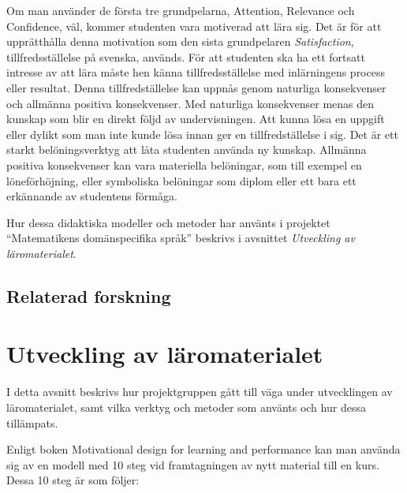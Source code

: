 \documentclass[]{article}
\begin{document}
Om man använder de första tre grundpelarna, Attention, Relevance och Confidence,
väl, kommer studenten vara motiverad att lära sig.
Det är för att upprätthålla denna motivation som den sista grundpelaren
\textit{Satisfaction}, tillfredsställelse på svenska, används.
För att studenten ska ha ett fortsatt intresse av att lära måste hen känna
tillfredsställelse med inlärningens process eller resultat.
Denna tillfredställelse kan uppnås genom naturliga konsekvenser och allmänna positiva
konsekvenser. Med naturliga konsekvenser menas den kunskap som blir
en direkt följd av undervisningen. Att kunna lösa en uppgift eller dylikt
som man inte kunde lösa innan ger en tillfredställelse i sig.
Det är ett starkt belöningsverktyg att låta studenten använda ny kunskap.
Allmänna positiva konsekvenser kan vara materiella belöningar,
som till exempel en löneförhöjning, eller symboliska belöningar som diplom
eller ett bara ett erkännande av studentens förmåga.

Hur dessa didaktiska modeller och metoder har använts i projektet
``Matematikens domänspecifika språk'' beskrivs i avsnittet
\textit{Utveckling av läromaterialet}.

\subsection{Relaterad forskning}

\section{Utveckling av läromaterialet}



I detta avsnitt beskrivs hur projektgruppen gått till väga under utvecklingen av läromaterialet, samt vilka verktyg och 
metoder som använts och hur dessa tillämpats.

Enligt boken Motivational design for learning and performance kan man använda sig av en modell med 10 steg vid 
framtagningen av nytt material till en kurs. Dessa 10 steg är som följer:
\end{document}
